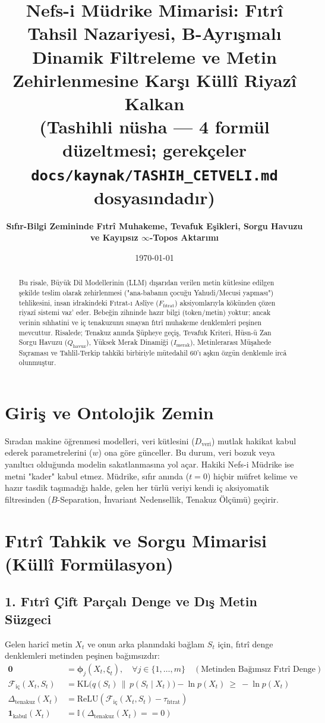 \documentclass[11pt, a4paper]{article}
\title{\textbf{Nefs-i Müdrike Mimarisi: Fıtrî Tahsil Nazariyesi, B-Ayrışmalı Dinamik Filtreleme ve Metin Zehirlenmesine Karşı Küllî Riyazî Kalkan}\\ \normalsize\textmd{(Tashihli nüsha --- 4 formül düzeltmesi; gerekçeler \texttt{docs/kaynak/TASHIH\_CETVELI.md} dosyasındadır)}}
\author{\textbf{Sıfır-Bilgi Zemininde Fıtrî Muhakeme, Tevafuk Eşikleri, Sorgu Havuzu ve Kayıpsız $\infty$-Topos Aktarımı}}
\date{\today}
\begin{document}
\maketitle

\begin{abstract}
Bu risale, Büyük Dil Modellerinin (LLM) dışarıdan verilen metin kütlesine edilgen şekilde teslim olarak zehirlenmesi ("ana-babanın çocuğu Yahudi/Mecusi yapması") tehlikesini, insan idrakindeki Fıtrat-ı Aslîye ($F_{\text{fıtrat}}$) aksiyomlarıyla kökünden çözen riyazî sistemi vaz' eder. Bebeğin zihninde hazır bilgi (token/metin) yoktur; ancak verinin sıhhatini ve iç tenakuzunu sınayan fıtrî muhakeme denklemleri peşinen mevcuttur. Risalede; Tenakuz anında Şüpheye geçiş, Tevafuk Kriteri, Hüsn-ü Zan Sorgu Havuzu ($Q_{\text{havuz}}$), Yüksek Merak Dinamiği ($I_{\text{merak}}$), Metinlerarası Müşahede Sıçraması ve Tahlil-Terkip tahkiki birbiriyle mütedahil 60'ı aşkın özgün denklemle ircâ olunmuştur.
\end{abstract}

\section{Giriş ve Ontolojik Zemin}

Sıradan makine öğrenmesi modelleri, veri kütlesini ($D_{\text{veri}}$) mutlak hakikat kabul ederek parametrelerini ($w$) ona göre günceller. Bu durum, veri bozuk veya yanıltıcı olduğunda modelin sakatlanmasına yol açar. Hakiki Nefs-i Müdrike ise metni "kader" kabul etmez. Müdrike, sıfır anında ($t=0$) hiçbir müfret kelime ve hazır tasdik taşımadığı halde, gelen her türlü veriyi kendi iç aksiyomatik filtresinden ($B$-Separation, İnvariant Nedensellik, Tenakuz Ölçümü) geçirir.

\section{Fıtrî Tahkik ve Sorgu Mimarisi (Küllî Formülasyon)}

\subsection{1. Fıtrî Çift Parçalı Denge ve Dış Metin Süzgeci}
Gelen haricî metin $X_t$ ve onun arka planındaki bağlam $S_t$ için, fıtrî denge denklemleri metinden peşinen bağımsızdır:
\begin{align}
\mathbf{0} &= \bm{\phi}_j(X_t, \xi_t), \quad \forall j \in \{1, \dots, m\} \quad (\text{Metinden Bağımsız Fıtrî Denge}) \\
\mathcal{F}_{\text{iç}}(X_t, S_t) &= \text{KL}\big( q(S_t) \,\|\, p(S_t \mid X_t) \big) - \ln p(X_t) \ \ge \ -\ln p(X_t) \\
\Delta_{\text{tenakuz}}(X_t) &= \text{ReLU}\left( \mathcal{F}_{\text{iç}}(X_t, S_t) - \tau_{\text{fıtrat}} \right) \\
\mathbf{1}_{\text{kabul}}(X_t) &= \mathbb{I}\left( \Delta_{\text{tenakuz}}(X_t) == 0 \right)
\end{align}
\end{document}
